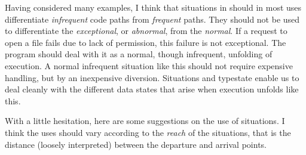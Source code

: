 \documentclass[10pt]{amsart}
\begin{document}
Having considered many examples, I think that situations in \Utop
should in most uses differentiate \emph{infrequent} code paths from
\emph{frequent} paths.  They should not be used to differentiate the
\emph{exceptional}, or \emph{abnormal}, from the \emph{normal}.  If a
request to open a file fails due to lack of permission, this failure
is not exceptional.  The program should deal with it as a normal,
though infrequent, unfolding of execution.  A normal infrequent
situation like this should not require expensive handling, but by an
inexpensive diversion.  Situations and typestate enable us to deal
cleanly with the different data states that arise when execution
unfolds like this.

With a little hesitation, here are some suggestions on the use of
situations.  I think the uses should vary according to the
\emph{reach} of the situations, that is the distance (loosely
interpreted) between the departure and arrival points.
\end{document}

